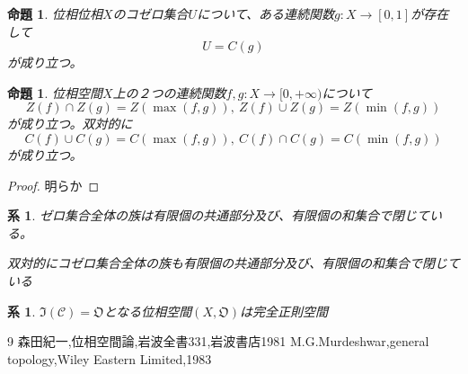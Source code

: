 \documentclass[leqno]{jsarticle}
\newtheorem{prop}[thm]{命題}
\newtheorem{cor}[thm]{系}
\newcommand{\mgn}{\infty}
\begin{document}
\begin{prop}
位相位相$X$のコゼロ集合$U$について、ある連続関数$g:X\to [0,1]$が存在して
\[
U=C(g)
\]
が成り立つ。
\end{prop}



\begin{prop}
位相空間$X$上の２つの連続関数$f,g:X\to [0,+\mgn)$について
\[
Z(f)\cap Z(g)=Z(\max(f,g)),\ Z(f)\cup Z(g)=Z(\min(f,g))
\]
が成り立つ。双対的に
\[
C(f)\cup C(g)=C(\max(f,g)),\ C(f)\cap C(g)=C(\min(f,g))
\]
が成り立つ。
\end{prop}
\begin{proof}
明らか
\end{proof}

\begin{cor}
ゼロ集合全体の族は有限個の共通部分及び、有限個の和集合で閉じている。\par
双対的にコゼロ集合全体の族も有限個の共通部分及び、有限個の和集合で閉じている
\end{cor}


\begin{cor}
$\mathfrak{I}(\mathcal{C})=\mathfrak{O}$となる位相空間$(X,\mathfrak{O})$は完全正則空間
\end{cor}


\begin{thebibliography}{9}
森田紀一,位相空間論,岩波全書331,岩波書店1981
M.G.Murdeshwar,general topology,Wiley Eastern Limited,1983
\end{thebibliography}




			
\end{document}
